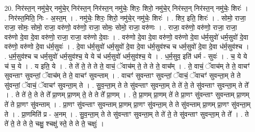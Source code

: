 \documentclass[17pt]{extarticle}
\begin{document}
20. निर॑स्त॒न् नमु॑चे॒र् नमु॑चे॒र् निर॑स्त॒न् निर॑स्त॒न् नमु॑चेः॒ शिरः॒ शिरो॒ नमु॑चे॒र् निर॑स्त॒न् निर॑स्त॒न् नमु॑चेः॒ शिरः॑ । . निर॑स्त॒मिति॒ निः - अ॒स्त॒म् । . नमु॑चेः॒ शिरः॒ शिरो॒ नमु॑चे॒र् नमु॑चेः॒ शिरः॑ । . शिर॒ इति॒ शिरः॑ । . सोमो॒ राजा॒ राजा॒ सोमः॒ सोमो॒ राजा॒ वरु॑णो॒ वरु॑णो॒ राजा॒ सोमः॒ सोमो॒ राजा॒ वरु॑णः । . राजा॒ वरु॑णो॒ वरु॑णो॒ राजा॒ राजा॒ वरु॑णो दे॒वा दे॒वा वरु॑णो॒ राजा॒ राजा॒ वरु॑णो दे॒वाः । . वरु॑णो दे॒वा दे॒वा वरु॑णो॒ वरु॑णो दे॒वा ध॑र्म॒सुवो॑ धर्म॒सुवो॑ दे॒वा वरु॑णो॒ वरु॑णो दे॒वा ध॑र्म॒सुवः॑ । . दे॒वा ध॑र्म॒सुवो॑ धर्म॒सुवो॑ दे॒वा दे॒वा ध॑र्म॒सुव॑श्च च धर्म॒सुवो॑ दे॒वा दे॒वा ध॑र्म॒सुव॑श्च । . ध॒र्म॒सुव॑श्च च धर्म॒सुवो॑ धर्म॒सुव॑श्च॒ ये ये च॑ धर्म॒सुवो॑ धर्म॒सुव॑श्च॒ ये । . ध॒र्म॒सुव॒ इति॑ धर्म - सुवः॑ । . च॒ ये ये च॑ च॒ ये । . य इति॒ ये । . ते ते॑ ते॒ ते ते ते॒ वाचं॒ ॅवाच॑म् ते॒ ते ते ते॒ वाच᳚म् । . ते॒ वाचं॒ ॅवाच॑म् ते ते॒ वाचꣳ॑ सुवन्ताꣳ सुवन्तां॒ ॅवाच॑म् ते ते॒ वाचꣳ॑ सुवन्ताम् । . वाचꣳ॑ सुवन्ताꣳ सुवन्तां॒ ॅवाचं॒ ॅवाचꣳ॑ सुवन्ता॒म् ते ते सु॑वन्तां॒ ॅवाचं॒ ॅवाचꣳ॑ सुवन्ता॒म् ते । . सु॒व॒न्ता॒म् ते ते सु॑वन्ताꣳ सुवन्ता॒म् ते ते॑ ते॒ ते सु॑वन्ताꣳ सुवन्ता॒म् ते ते᳚ । . ते ते॑ ते॒ ते ते ते᳚ प्रा॒णम् प्रा॒णम् ते॒ ते ते ते᳚ प्रा॒णम् । . ते॒ प्रा॒णम् प्रा॒णम् ते॑ ते प्रा॒णꣳ सु॑वन्ताꣳ सुवन्ताम् प्रा॒णम् ते॑ ते प्रा॒णꣳ सु॑वन्ताम् । . प्रा॒णꣳ सु॑वन्ताꣳ सुवन्ताम् प्रा॒णम् प्रा॒णꣳ सु॑वन्ता॒म् ते ते सु॑वन्ताम् प्रा॒णम् प्रा॒णꣳ सु॑वन्ता॒म् ते । . प्रा॒णमिति॑ प्र - अ॒नम् । . सु॒व॒न्ता॒म् ते ते सु॑वन्ताꣳ सुवन्ता॒म् ते ते॑ ते॒ ते सु॑वन्ताꣳ सुवन्ता॒म् ते ते᳚ । . ते ते॑ ते॒ ते ते ते॒ चक्षु॒ श्चक्षु॑ स्ते॒ ते ते ते॒ चक्षुः॑ । \newline
\end{document}

